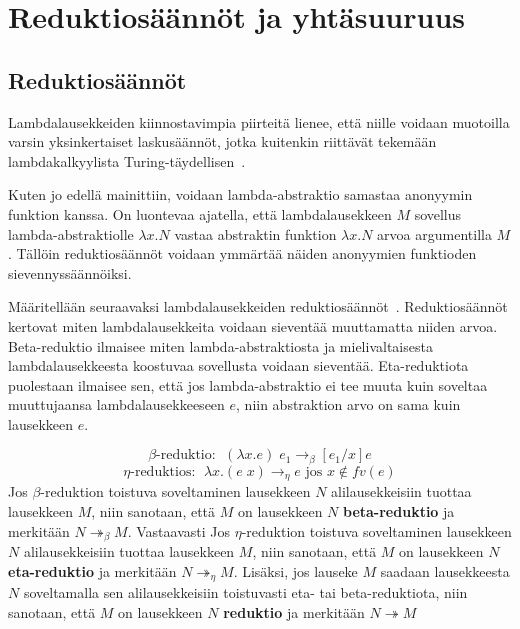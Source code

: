 \section{Reduktiosäännöt ja yhtäsuuruus}

\subsection{Reduktiosäännöt}
Lambdalausekkeiden kiinnostavimpia piirteitä lienee, että niille voidaan muotoilla varsin yksinkertaiset laskusäännöt, jotka kuitenkin riittävät tekemään lambdakalkyylista Turing-täydellisen~\cite[liite]{Turing36}.  
\par
Kuten jo edellä mainittiin, voidaan lambda-abstraktio samastaa anonyymin funktion kanssa. On luontevaa ajatella, että lambdalausekkeen $M$ sovellus lambda-abstraktiolle $\lambda x . N$ vastaa abstraktin funktion $\lambda x . N$ arvoa argumentilla $M$. Tällöin reduktiosäännöt voidaan ymmärtää näiden anonyymien funktioden sievennyssäännöiksi.
\par
Määritellään seuraavaksi lambdalausekkeiden reduktiosäännöt~\cite[s.~9]{Hudak89}. Reduktiosäännöt kertovat miten lambdalausekkeita voidaan sieventää muuttamatta niiden arvoa. Beta-reduktio ilmaisee miten lambda-abstraktiosta ja mielivaltaisesta lambdalausekkeesta koostuvaa sovellusta voidaan sieventää. Eta-reduktiota puolestaan ilmaisee sen, että jos lambda-abstraktio ei tee muuta kuin soveltaa muuttujaansa lambdalausekkeeseen $e$, niin abstraktion arvo on sama kuin lausekkeen $e$.    

\begin{maar}[reduktiosäännöt]	
\[\beta \text{-reduktio: } \; (\lambda x.e )\; e_{1} \rightarrow_{\beta} [e_{1} / x]e \]
\[\eta \text{-reduktios: } \; \lambda x.(e \; x) \rightarrow_{\eta} e \text{ jos } x \notin fv(e) \]	
Jos $\beta$-reduktion toistuva soveltaminen lausekkeen $N$ alilausekkeisiin tuottaa lausekkeen $M$, niin sanotaan, että $M$ on lausekkeen $N$ \textbf{beta-reduktio} ja merkitään $N  \twoheadrightarrow_{\beta} M$. Vastaavasti Jos $\eta$-reduktion toistuva soveltaminen lausekkeen $N$ alilausekkeisiin tuottaa lausekkeen $M$, niin sanotaan, että $M$ on lausekkeen $N$ \textbf{eta-reduktio} ja merkitään $N  \twoheadrightarrow_{\eta} M$. Lisäksi, jos lauseke $M$ saadaan lausekkeesta $N$ soveltamalla sen alilausekkeisiin toistuvasti eta- tai beta-reduktiota, niin sanotaan, että $M$ on lausekkeen $N$ \textbf{reduktio} ja merkitään $N  \twoheadrightarrow M$        
\end{maar}

